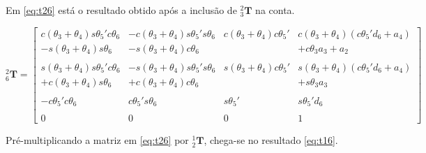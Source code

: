 Em \ref{eq:t26} está o resultado obtido após a inclusão de $^2_3\textbf{T}$ na conta.

\begin{equation}
    \label{eq:t26}
    ^2_6\textbf{T} = \begin{bmatrix}
        c(\theta_3+\theta_4)s\theta_5'c\theta_6 & -c(\theta_3+\theta_4)s\theta_5's\theta_6  & c(\theta_3+\theta_4)c\theta_5' & c(\theta_3+\theta_4)(c\theta_5'd_6 + a_4) \\
        -s(\theta_3+\theta_4)s\theta_6          & -s(\theta_3+\theta_4)c\theta_6            &                                & +c\theta_3a_3 + a_2\\
        \\
        s(\theta_3+\theta_4)s\theta_5'c\theta_6 & -s(\theta_3+\theta_4)s\theta_5's\theta_6  & s(\theta_3+\theta_4)c\theta_5' & s(\theta_3+\theta_4)(c\theta_5'd_6 + a_4) \\
        +c(\theta_3+\theta_4)s\theta_6          & +c(\theta_3+\theta_4)c\theta_6            &                                & +s\theta_3a_3 \\
        \\
        -c\theta_5'c\theta_6                    & c\theta_5's\theta_6                       & s\theta_5'                     & s\theta_5'd_6 \\
        \\
        0 & 0 & 0 & 1
    \end{bmatrix}
\end{equation}

Pré-multiplicando a matriz em \ref{eq:t26} por $^1_2\textbf{T}$, chega-se no resultado \ref{eq:t16}.

